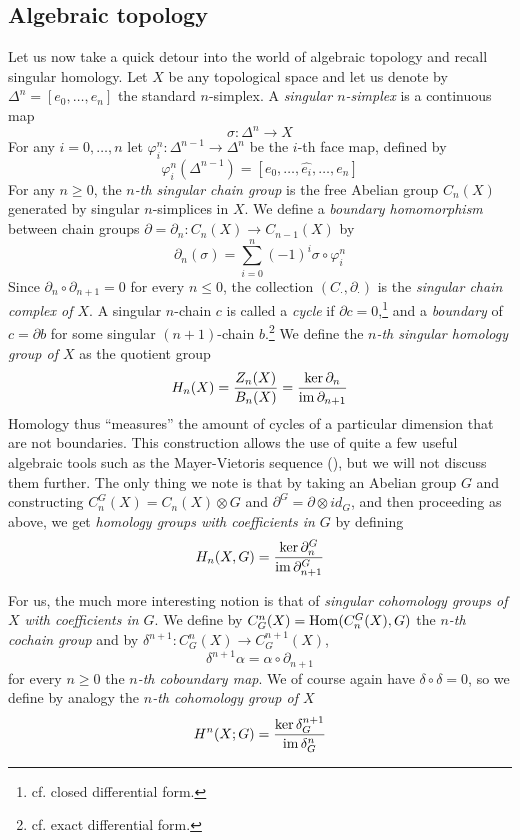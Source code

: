 \documentclass[a4paper, 12pt]{article}
\begin{document}
\subsection{Algebraic topology}

Let us now take a quick detour into the world of algebraic topology and recall singular homology.
Let $X$ be any topological space and let us denote by $\Delta^n = [e_0,\dots,e_n]$ the standard $n$-simplex.
A \emph{singular $n$-simplex} is a continuous map
\[
    \sigma \colon \Delta^n \to X
\]
For any $i = 0,\dots, n$ let $\varphi_i^n \colon \Delta^{n-1} \to \Delta^n$ be the $i$-th face map, defined by
\[
    \varphi_i^n(\Delta^{n-1}) = [e_0,\dots,\hat{e_i},\dots,e_n]
\]
For any $n\geq 0$, the \emph{$n$-th singular chain group} is the free Abelian group $C_n(X)$ generated by singular $n$-simplices in $X$.
We define a \emph{boundary homomorphism} between chain groups $\partial = \partial_n \colon C_n(X) \to C_{n-1}(X)$ by
\[
    \partial_n(\sigma) = \sum_{i=0}^{n}(-1)^i\sigma\circ\varphi_i^n
\]
Since $\partial_n \circ \partial_{n+1} = 0$ for every $n \leq 0$, the collection $(C_\cdot, \partial_\cdot)$ is the \emph{singular chain complex of $X$}.
A singular $n$-chain $c$ is called a \emph{cycle} if $\partial c = 0$,\footnote{cf. closed differential form.}
and a \emph{boundary} of $c = \partial b$ for some singular $(n+1)$-chain $b$.\footnote{cf. exact differential form.}
We define the \emph{$n$-th singular homology group of $X$} as the quotient group
\[
    H_n(X) = \frac{Z_n(X)}{B_n(X)} = \frac{\ker\partial_n}{\operatorname{im}\partial_{n+1}}
\]
Homology thus ``measures'' the amount of cycles of a particular dimension that are not boundaries.
This construction allows the use of quite a few useful algebraic tools such as the Mayer-Vietoris sequence (\cite[p. 149]{Hatcher2002}),
but we will not discuss them further.
The only thing we note is that by taking an Abelian group $G$ and constructing $C_n^G(X) = C_n(X) \otimes G$ and $\partial^G = \partial \otimes id_G$,
and then proceeding as above, we get \emph{homology groups with coefficients in $G$} by defining
\[
    H_n(X, G) = \frac{\ker\partial_n^G}{\operatorname{im}\partial_{n+1}^G}
\]

For us, the much more interesting notion is that of \emph{singular cohomology groups of $X$ with coefficients in $G$}.
We define by $C_G^n(X) = \operatorname{Hom}(C_n^G(X), G)$ the \emph{$n$-th cochain group} and by $\delta^{n+1} \colon C_G^n(X) \to C_G^{n+1}(X)$,
\[
    \delta^{n+1}\alpha = \alpha\circ\partial_{n+1}
\]
for every $n\geq 0$ the \emph{$n$-th coboundary map}.
We of course again have $\delta\circ\delta = 0$, so we define by analogy the \emph{$n$-th cohomology group of $X$}
\[
    H^n(X; G) = \frac{\ker\delta_G^{n+1}}{\operatorname{im}\delta_G^n}
\]
\end{document}
